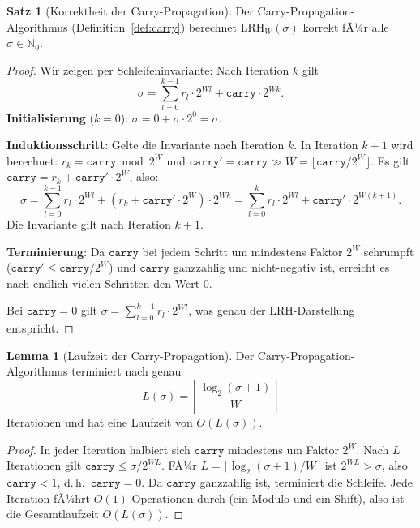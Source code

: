 ﻿\documentclass[a4paper,12pt]{article}
\theoremstyle{definition}
\newtheorem{satz}{Satz}
\newtheorem{lemma}{Lemma}
\begin{document}
\begin{satz}[Korrektheit der Carry-Propagation]
\label{satz:carry_korrekt}
Der Carry-Propagation-Algorithmus (Definition~\ref{def:carry}) berechnet
$\mathrm{LRH}_W(\sigma)$ korrekt fÃ¼r alle $\sigma \in \mathbb{N}_0$.
\end{satz}

\begin{proof}
Wir zeigen per Schleifeninvariante: Nach Iteration $k$ gilt
\[
  \sigma = \sum_{l=0}^{k-1} r_l \cdot 2^{Wl} + \mathtt{carry} \cdot 2^{Wk}.
\]
\textbf{Initialisierung} ($k=0$): $\sigma = 0 + \sigma \cdot 2^0 = \sigma$. \checkmark

\textbf{Induktionsschritt}: Gelte die Invariante nach Iteration $k$.
In Iteration $k+1$ wird berechnet:
$r_k = \mathtt{carry} \bmod 2^W$ und $\mathtt{carry}' = \mathtt{carry} \gg W
= \lfloor \mathtt{carry} / 2^W \rfloor$.
Es gilt $\mathtt{carry} = r_k + \mathtt{carry}' \cdot 2^W$, also:
\[
  \sigma = \sum_{l=0}^{k-1} r_l \cdot 2^{Wl} + (r_k + \mathtt{carry}' \cdot 2^W) \cdot 2^{Wk}
         = \sum_{l=0}^{k} r_l \cdot 2^{Wl} + \mathtt{carry}' \cdot 2^{W(k+1)}.
\]
Die Invariante gilt nach Iteration $k+1$. \checkmark

\textbf{Terminierung}: Da $\mathtt{carry}$ bei jedem Schritt um mindestens Faktor $2^W$
schrumpft ($\mathtt{carry}' \leq \mathtt{carry} / 2^W$) und $\mathtt{carry}$ ganzzahlig
und nicht-negativ ist, erreicht es nach endlich vielen Schritten den Wert $0$.

Bei $\mathtt{carry} = 0$ gilt $\sigma = \sum_{l=0}^{k-1} r_l \cdot 2^{Wl}$, was genau der
LRH-Darstellung entspricht.
\end{proof}

\begin{lemma}[Laufzeit der Carry-Propagation]
\label{lem:carry_laufzeit}
Der Carry-Propagation-Algorithmus terminiert nach genau
\[
  L(\sigma) = \left\lceil \frac{\log_2(\sigma+1)}{W} \right\rceil
\]
Iterationen und hat eine Laufzeit von $O(L(\sigma))$.
\end{lemma}

\begin{proof}
In jeder Iteration halbiert sich $\mathtt{carry}$ mindestens um Faktor $2^W$.
Nach $L$ Iterationen gilt $\mathtt{carry} \leq \sigma / 2^{WL}$.
FÃ¼r $L = \lceil \log_2(\sigma+1) / W \rceil$ ist $2^{WL} > \sigma$, also
$\mathtt{carry} < 1$, d.\,h.\ $\mathtt{carry} = 0$. Da $\mathtt{carry}$ ganzzahlig ist,
terminiert die Schleife. Jede Iteration fÃ¼hrt $O(1)$ Operationen durch
(ein Modulo und ein Shift), also ist die Gesamtlaufzeit $O(L(\sigma))$.
\end{proof}
\end{document}
